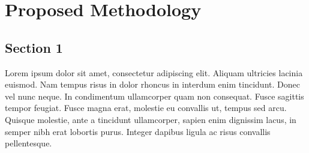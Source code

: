 
\chapter{Proposed Methodology} %

\label{chapter:Methodology} %



\section{Section 1}

Lorem ipsum dolor sit amet, consectetur adipiscing elit. Aliquam ultricies lacinia euismod. Nam tempus risus in dolor rhoncus in interdum enim tincidunt. Donec vel nunc neque. In condimentum ullamcorper quam non consequat. Fusce sagittis tempor feugiat. Fusce magna erat, molestie eu convallis ut, tempus sed arcu. Quisque molestie, ante a tincidunt ullamcorper, sapien enim dignissim lacus, in semper nibh erat lobortis purus. Integer dapibus ligula ac risus convallis pellentesque.
